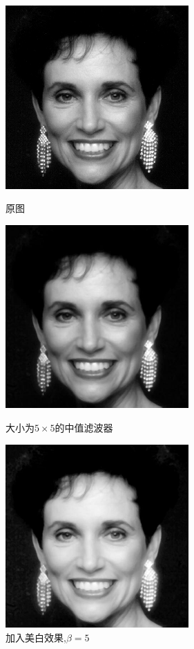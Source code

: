 \documentclass[11pt, a4paper, UTF8]{ctexart}
\begin{document}
    \begin{figure}[H]
      \centering
      \begin{minipage}[t]{0.48\textwidth}
      \centering
      \includegraphics[width=7cm]{woman.png}
      \caption{原图}
      \end{minipage}
      \begin{minipage}[t]{0.48\textwidth}
      \centering
      \includegraphics[width=7cm]{mid.jpg}
      \caption{大小为$5\times 5$的中值滤波器}
      \end{minipage}
      \begin{minipage}[t]{0.48\textwidth}
        \centering
        \includegraphics[width=7cm]{mid_log.jpg}
        \caption{加入美白效果,$\beta=5$}
        \end{minipage}
    \end{figure}
\end{document}
